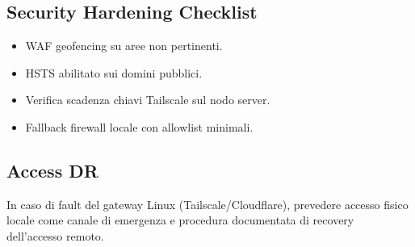 \documentclass[11pt,a4paper]{article}
\begin{document}
\subsection{Security Hardening Checklist}
\begin{itemize}
  \item WAF geofencing su aree non pertinenti.
  \item HSTS abilitato sui domini pubblici.
  \item Verifica scadenza chiavi Tailscale sul nodo server.
  \item Fallback firewall locale con allowlist minimali.
\end{itemize}

\subsection{Access DR}
In caso di fault del gateway Linux (Tailscale/Cloudflare), prevedere accesso fisico locale come canale di emergenza e procedura documentata di recovery dell'accesso remoto.
\end{document}
